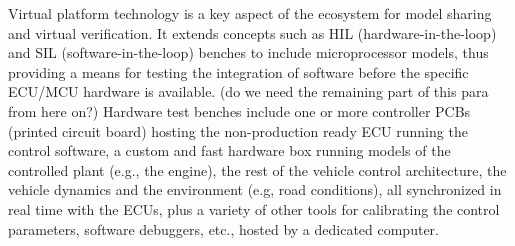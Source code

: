 \small





Virtual platform technology is a key aspect of the ecosystem for model sharing and virtual verification.
It extends concepts such as HIL (hardware-in-the-loop) and SIL (software-in-the-loop) benches to include microprocessor models, thus providing a means for testing the integration of software before the specific ECU/MCU hardware is available. (do we need the remaining part of this para from here on?) Hardware test benches include one or more controller PCBs (printed circuit board) hosting the non-production ready ECU running the control software, a custom and fast hardware box running models of the controlled plant (e.g., the engine), the rest of the vehicle control architecture, the vehicle dynamics and the environment (e.g, road conditions), all synchronized in real time with the ECUs, plus a variety of other tools for calibrating the control parameters, software debuggers, etc., hosted by a dedicated computer.

